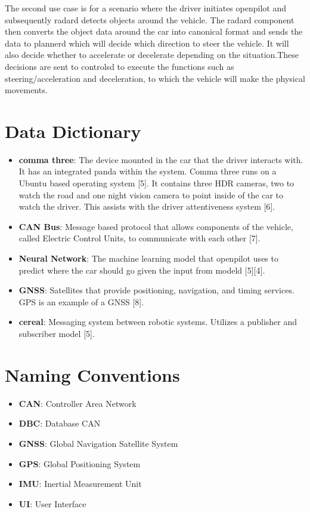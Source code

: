 \documentclass[12pt]{article}
\begin{document}
The second use case is for a scenario where the driver initiates openpilot and subsequently radard detects objects around the vehicle. The radard component then converts the object data around the car into canonical format and sends the data to plannerd which will decide which direction to steer the vehicle. It will also decide whether to accelerate or decelerate depending on the situation.These decisions are sent to controlsd to execute the functions such as steering/acceleration and deceleration, to which the vehicle will make the physical movements.
\newpage
\section{Data Dictionary}

    \begin{itemize}

        \item[] \textbf{comma three}: The device mounted in the car that the driver interacts with. It has an integrated panda within the system. Comma three runs on a Ubuntu based operating system [5]. It contains three HDR cameras, two to watch the road and one night vision camera to point inside of the car to watch the driver. This assists with the driver attentiveness system [6].
        \item[] \textbf{CAN Bus}: Message based protocol that allows components of the vehicle, called Electric Control Units, to communicate with each other [7].
        \item[] \textbf{Neural Network}: The machine learning model that openpilot uses to predict where the car should go given the input from modeld [5][4].
        \item[] \textbf{GNSS}: Satellites that provide positioning, navigation, and timing services. GPS is an example of a GNSS [8].
        \item[] \textbf{cereal}: Messaging system between robotic systems. Utilizes a publisher and subscriber model [5].
        

    \end{itemize}

\section{Naming Conventions}

    \begin{itemize}

        \item[] \textbf{CAN}: Controller Area Network
        \item[] \textbf{DBC}: Database CAN
        \item[] \textbf{GNSS}: Global Navigation Satellite System
        \item[] \textbf{GPS}: Global Positioning System
        \item[] \textbf{IMU}: Inertial Measurement Unit
        \item[] \textbf{UI}: User Interface
        

    \end{itemize}
\end{document}
